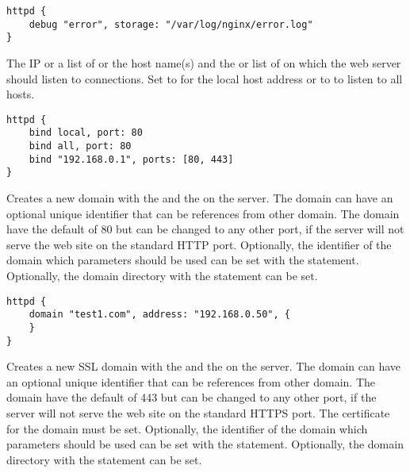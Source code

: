 \begin{lstlisting}[style=Java]
httpd {
    debug "error", storage: "/var/log/nginx/error.log"
}
\end{lstlisting}


The IP  or a list of  or the host name(s) and
the  or list of  on which the web server should listen 
to connections. Set to  for the local host 
address  or to  to listen to all hosts.

\begin{lstlisting}[style=Java]
httpd {
    bind local, port: 80
    bind all, port: 80
    bind "192.168.0.1", ports: [80, 443]
}
\end{lstlisting}


Creates a new domain with the  and the  on the server.
The domain can have an optional unique identifier  that can be 
references from other domain. The domain have the default  of 80 but can 
be changed to any other port, if the server will not serve the web site on the
standard HTTP port. 
Optionally, the identifier  of the domain which parameters 
should be used can be set with the  statement. 
Optionally, the domain  directory with the  
statement can be set. 

\begin{lstlisting}[style=Java]
httpd {
    domain "test1.com", address: "192.168.0.50", {
    }
}
\end{lstlisting}


Creates a new SSL domain with the  and the  on the server.
The domain can have an optional unique identifier  that can be 
references from other domain. The domain have the default  of 443 but can 
be changed to any other port, if the server will not serve the web site on the
standard HTTPS port. 
The certificate for the domain must be set.
Optionally, the identifier  of the domain which parameters 
should be used can be set with the  statement. 
Optionally, the domain  directory with the  
statement can be set. 

